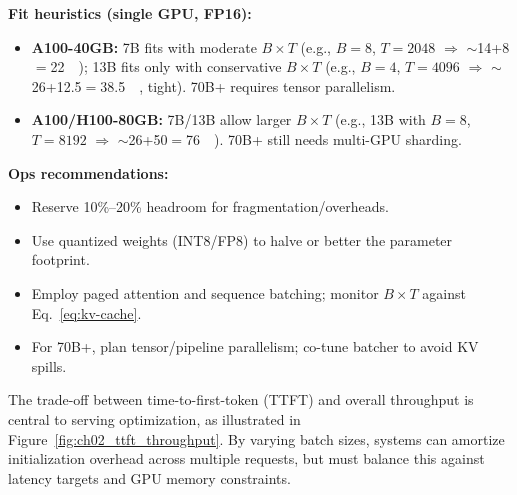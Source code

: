 \begin{tcolorbox}
\medskip
\noindent\textbf{Fit heuristics (single GPU, FP16):}
\begin{itemize}[leftmargin=1.2em, itemsep=2pt]
\item \textbf{A100-40GB:} 7B fits with moderate $B{\times}T$ (e.g., $B{=}8$, $T{=}2048$ $\Rightarrow$ $\sim$14+8$=$\SI{22}{\gibi\byte}); 13B fits only with conservative $B{\times}T$ (e.g., $B{=}4$, $T{=}4096$ $\Rightarrow$ $\sim$26+12.5$=$\SI{38.5}{\gibi\byte}, tight). 70B+ requires tensor parallelism.
\item \textbf{A100/H100-80GB:} 7B/13B allow larger $B{\times}T$ (e.g., 13B with $B{=}8$, $T{=}8192$ $\Rightarrow$ $\sim$26+50$=$\SI{76}{\gibi\byte}). 70B+ still needs multi-GPU sharding.
\end{itemize}

\medskip
\noindent\textbf{Ops recommendations:}
\begin{itemize}[leftmargin=1.2em, itemsep=2pt]
\item Reserve 10\%--20\% headroom for fragmentation/overheads.
\item Use quantized weights (INT8/FP8) to halve or better the parameter footprint.
\item Employ paged attention and sequence batching; monitor $B{\times}T$ against Eq.~\ref{eq:kv-cache}.
\item For 70B+, plan tensor/pipeline parallelism; co-tune batcher to avoid KV spills.
\end{itemize}
\end{tcolorbox}

The trade-off between time-to-first-token (TTFT) and overall throughput is central to serving optimization, as illustrated in Figure~\ref{fig:ch02_ttft_throughput}. By varying batch sizes, systems can amortize initialization overhead across multiple requests, but must balance this against latency targets and GPU memory constraints.


